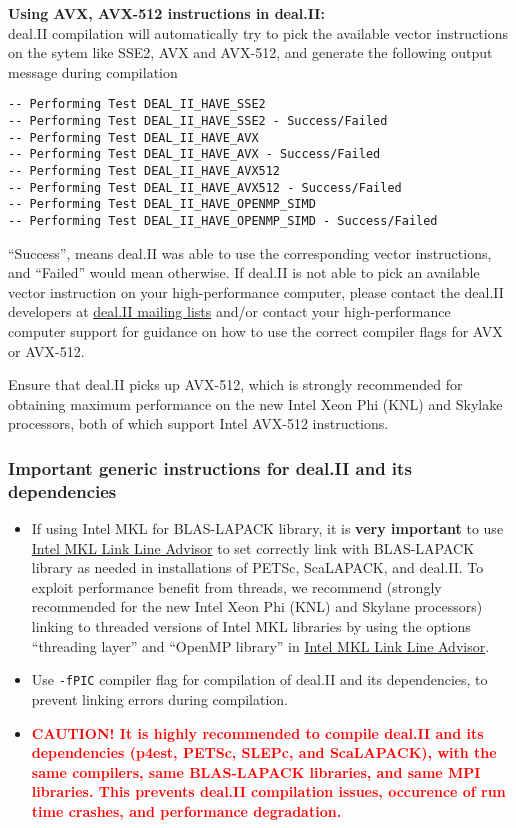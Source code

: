 {\bf Using AVX, AVX-512 instructions in deal.II:}\\
deal.II compilation will automatically try to pick the available vector instructions on the sytem like SSE2, AVX and AVX-512, and generate the following output message during compilation   
\begin{verbatim}
-- Performing Test DEAL_II_HAVE_SSE2
-- Performing Test DEAL_II_HAVE_SSE2 - Success/Failed
-- Performing Test DEAL_II_HAVE_AVX
-- Performing Test DEAL_II_HAVE_AVX - Success/Failed
-- Performing Test DEAL_II_HAVE_AVX512
-- Performing Test DEAL_II_HAVE_AVX512 - Success/Failed
-- Performing Test DEAL_II_HAVE_OPENMP_SIMD
-- Performing Test DEAL_II_HAVE_OPENMP_SIMD - Success/Failed
\end{verbatim}
``Success'', means deal.II was able to use the corresponding vector instructions, and ``Failed'' would mean otherwise. If deal.II is not able to pick an available vector instruction on your high-performance computer, please contact the deal.II developers at \href{https://groups.google.com/d/forum/dealii}{deal.II mailing lists} and/or contact your high-performance computer support for guidance on how to use the correct compiler flags for AVX or AVX-512. 

Ensure that deal.II picks up AVX-512, which is strongly recommended for obtaining maximum performance on the new Intel Xeon Phi (KNL) and Skylake processors, both of which support Intel AVX-512 instructions.

\subsubsection{Important generic instructions for deal.II and its dependencies}
\begin{itemize}
\item If using Intel MKL for BLAS-LAPACK library, it is {\bf very important} to use \href{https://software.intel.com/en-us/articles/intel-mkl-link-line-advisor}{Intel MKL Link Line Advisor} to set correctly link with BLAS-LAPACK library as needed in installations of PETSc, ScaLAPACK, and deal.II. To exploit performance benefit from threads, we recommend (strongly recommended for the new Intel Xeon Phi (KNL) and Skylane processors) linking to threaded versions of Intel MKL libraries by using the options ``threading layer'' and  ``OpenMP library'' in \href{https://software.intel.com/en-us/articles/intel-mkl-link-line-advisor}{Intel MKL Link Line Advisor}.

\item Use \verb|-fPIC| compiler flag for compilation of deal.II and its dependencies, to prevent linking errors during \dftfe{} compilation.	

\item \textcolor{red}{\bf CAUTION! It is  highly recommended to compile deal.II and its dependencies (p4est, PETSc, SLEPc, and ScaLAPACK),  with the same compilers, same BLAS-LAPACK libraries, and same MPI libraries. This prevents deal.II compilation issues, occurence of run time crashes, and \dftfe{} performance degradation.}  
\end{itemize}

